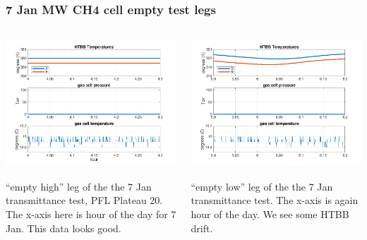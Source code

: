 \documentclass[10pt]{beamer}
\begin{document}
\begin{frame}
\frametitle{7 Jan MW CH4 cell empty test legs}
\begin{columns}[t]
\begin{column}{0.5\textwidth}
  \begin{centering}
  \includegraphics[width=\textwidth]{figures/MW_high_empty_gas_unknown.png}
  \end{centering}\vspace{3mm}

 ``empty high'' leg of the the 7 Jan transmittance test, PFL Plateau
  20.  The x-axis here is hour of the day for 7 Jan.  This data
  looks good.

\end{column}
\begin{column}{0.5\textwidth}  
  \begin{centering}
  \includegraphics[width=\textwidth]{figures/MW_low_empty_gas_unknown.png}
  \end{centering}\vspace{3mm}

 ``empty low'' leg of the the 7 Jan transmittance test.  The x-axis
  is again hour of the day.  We see some HTBB drift.

\end{column}
\end{columns}
\end{frame}
\end{document}
